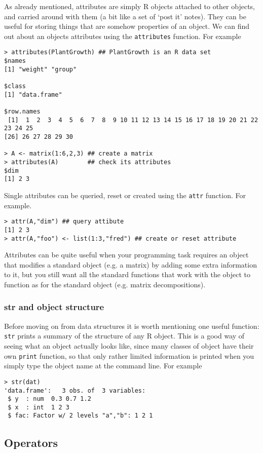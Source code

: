 \documentclass[10pt] {article}
\theoremstyle{definition}
\begin{document}
As already mentioned, attributes are simply R objects attached to other objects, and carried around with them (a bit like a set of `post it' notes). They can be useful for storing things that are somehow properties of an object. We can find out about an objects attributes using the \lstinline+attributes+ function. For example
\begin{lstlisting}
> attributes(PlantGrowth) ## PlantGrowth is an R data set
$names
[1] "weight" "group" 

$class
[1] "data.frame"

$row.names
 [1]  1  2  3  4  5  6  7  8  9 10 11 12 13 14 15 16 17 18 19 20 21 22 23 24 25
[26] 26 27 28 29 30

> A <- matrix(1:6,2,3) ## create a matrix
> attributes(A)        ## check its attributes
$dim
[1] 2 3
\end{lstlisting}
Single attributes can be queried, reset or created using the \lstinline+attr+ function. For example.
\begin{lstlisting}
> attr(A,"dim") ## query attibute
[1] 2 3
> attr(A,"foo") <- list(1:3,"fred") ## create or reset attribute
\end{lstlisting}
Attributes can be quite useful when your programming task requires an object that modifies a standard object (e.g. a matrix) by adding some extra information to it, but you still want all the standard functions that work with the object to function as for the standard object (e.g. matrix decompositions).    

\subsubsection{str and object structure}

Before moving on from data structures it is worth mentioning one useful function: {\tt str} prints a summary of the structure of any R object. This is a good way of seeing what an object actually looks like, since many classes of object have their own {\tt print} function, so that only rather limited information is printed when you simply type the object name at the command line. For example 
\begin{lstlisting}
> str(dat)
'data.frame':	3 obs. of  3 variables:
 $ y  : num  0.3 0.7 1.2
 $ x  : int  1 2 3
 $ fac: Factor w/ 2 levels "a","b": 1 2 1
\end{lstlisting}

\subsection{Operators} 
\end{document}

